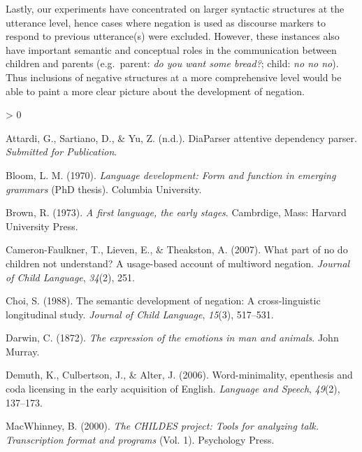 \documentclass[
  english,
  man,floatsintext]{apa6}
\newlength{\cslhangindent}
\newenvironment{CSLReferences}[2] %
 {%
  \setlength{\parindent}{0pt}
  \ifodd #1 \everypar{\setlength{\hangindent}{\cslhangindent}}\ignorespaces\fi
  \ifnum #2 > 0
  \setlength{\parskip}{#2\baselineskip}
  \fi
 }%
 {}
\begin{document}
Lastly, our experiments have concentrated on larger syntactic structures at the utterance level, hence cases where negation is used as discourse markers to respond to previous utterance(s) were excluded. However, these instances also have important semantic and conceptual roles in the communication between children and parents (e.g.~parent: \emph{do you want some bread?}; child: \emph{no no no}). Thus inclusions of negative structures at a more comprehensive level would be able to paint a more clear picture about the development of negation.

\begingroup
\setlength{\parindent}{-0.5in}
\setlength{\leftskip}{0.5in}

\endgroup

\hypertarget{refs}{}
\begin{CSLReferences}{1}{0}
\leavevmode\hypertarget{ref-diaparser}{}%
Attardi, G., Sartiano, D., \& Yu, Z. (n.d.). DiaParser attentive dependency parser. \emph{Submitted for Publication}.

\leavevmode\hypertarget{ref-bloom1970language}{}%
Bloom, L. M. (1970). \emph{Language development: Form and function in emerging grammars} (PhD thesis). Columbia University.

\leavevmode\hypertarget{ref-Brown1973}{}%
Brown, R. (1973). \emph{A first language, the early stages}. Cambrdige, Mass: Harvard University Press.

\leavevmode\hypertarget{ref-cameron2007part}{}%
Cameron-Faulkner, T., Lieven, E., \& Theakston, A. (2007). What part of no do children not understand? A usage-based account of multiword negation. \emph{Journal of Child Language}, \emph{34}(2), 251.

\leavevmode\hypertarget{ref-choi1988semantic}{}%
Choi, S. (1988). The semantic development of negation: A cross-linguistic longitudinal study. \emph{Journal of Child Language}, \emph{15}(3), 517--531.

\leavevmode\hypertarget{ref-darwin1872expression}{}%
Darwin, C. (1872). \emph{The expression of the emotions in man and animals}. John Murray.

\leavevmode\hypertarget{ref-demuth2006word}{}%
Demuth, K., Culbertson, J., \& Alter, J. (2006). Word-minimality, epenthesis and coda licensing in the early acquisition of {E}nglish. \emph{Language and Speech}, \emph{49}(2), 137--173.

\leavevmode\hypertarget{ref-macwhinney2000childes}{}%
MacWhinney, B. (2000). \emph{The CHILDES project: Tools for analyzing talk. Transcription format and programs} (Vol. 1). Psychology Press.


\end{CSLReferences}
\end{document}
